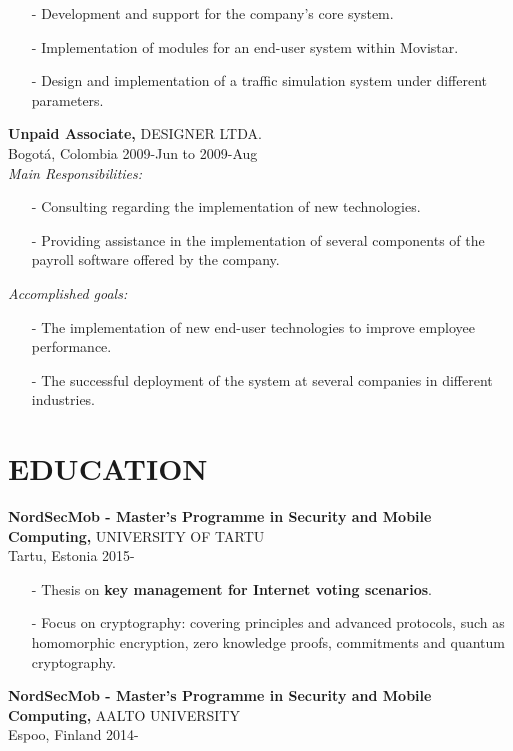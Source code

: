 \documentclass[line,margin]{res}
\begin{document}
\begin{resume}
	\begin{itemize}
		\item[-] Development and support for the company's core system.
		\item[-] Implementation of modules for an end-user system within Movistar.
		\item[-] Design and implementation of a traffic simulation system under different parameters.
	\end{itemize}
      {\bf Unpaid Associate,} DESIGNER LTDA.\\
	Bogot\'a, Colombia  2009-Jun to 2009-Aug\\
	\emph{Main Responsibilities: }
	
	\begin{itemize}
		\item[-] Consulting regarding the implementation of new technologies.
		\item[-] Providing assistance in the implementation of several components of the payroll software offered by the company.
	\end{itemize}
	
	\emph{Accomplished goals: }
	
	\begin{itemize}
		\item[-] The implementation of new end-user technologies to improve employee performance.
		\item[-] The successful deployment of the system at several companies in different industries.
	\end{itemize}
 
 
 \section{EDUCATION} 

 {\bf NordSecMob - Master's Programme in Security and Mobile Computing,} \mbox{UNIVERSITY} OF TARTU\\
		Tartu, Estonia 2015-

	\begin{itemize}
		\item[-] Thesis on \textbf{key management for Internet voting scenarios}.
		\item[-] Focus on cryptography: covering principles and advanced protocols, such as homomorphic encryption, zero knowledge proofs, commitments and quantum cryptography.
	\end{itemize}

{\bf NordSecMob - Master's Programme in Security and Mobile Computing,} AALTO UNIVERSITY\\
		Espoo, Finland  2014-


\end{resume}
\end{document}
